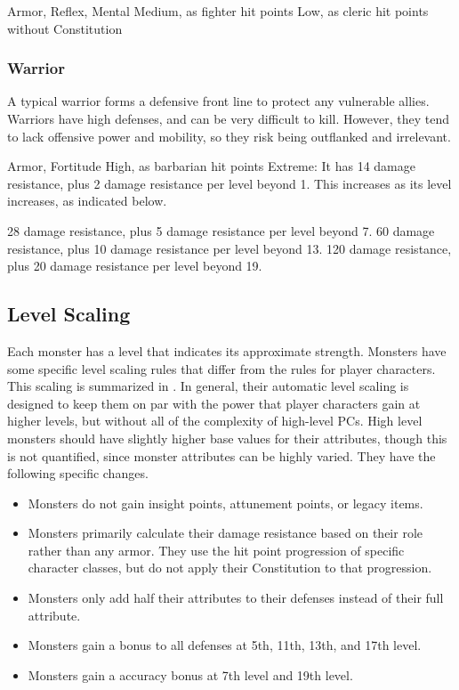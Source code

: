         Armor,  Reflex,  Mental
       Medium, as fighter hit points
       Low, as cleric hit points without Constitution

    \subsubsection{Warrior}
      A typical warrior forms a defensive front line to protect any vulnerable allies.
      Warriors have high defenses, and can be very difficult to kill.
      However, they tend to lack offensive power and mobility, so they risk being outflanked and irrelevant.

        Armor,  Fortitude
       High, as barbarian hit points
       Extreme: It has 14 damage resistance, plus 2 damage resistance per level beyond 1.
      This increases as its level increases, as indicated below.
      \begin{itemize}
         28 damage resistance, plus 5 damage resistance per level beyond 7.
         60 damage resistance, plus 10 damage resistance per level beyond 13.
         120 damage resistance, plus 20 damage resistance per level beyond 19.
      \end{itemize}

  \subsection{Level Scaling}
    Each monster has a level that indicates its approximate strength.
    Monsters have some specific level scaling rules that differ from the rules for player characters.
    This scaling is summarized in .
    In general, their automatic level scaling is designed to keep them on par with the power that player characters gain at higher levels, but without all of the complexity of high-level PCs.
    High level monsters should have slightly higher base values for their attributes, though this is not quantified, since monster attributes can be highly varied.
    They have the following specific changes.
    \begin{itemize}
      \item Monsters do not gain insight points, attunement points, or legacy items.
      \item Monsters primarily calculate their damage resistance based on their role rather than any armor.
        They use the hit point progression of specific character classes, but do not apply their Constitution to that progression.
      \item Monsters only add half their attributes to their defenses instead of their full attribute.
      \item Monsters gain a  bonus to all defenses at 5th, 11th, 13th, and 17th level.
      \item Monsters gain a  accuracy bonus at 7th level and 19th level.
    \end{itemize}

